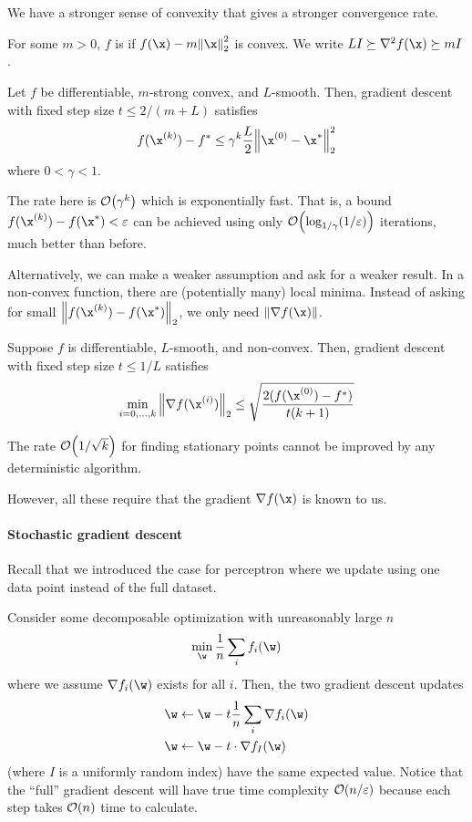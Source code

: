 \documentclass[class=cs480,notes,tikz]{agony}
\begin{document}
We have a stronger sense of convexity that gives a stronger convergence rate.

\begin{defn}
  For some $m > 0$, $f$ is 
  if $f(\x) - m\norm{\x}_2^2$ is convex.
  We write $LI \succeq \nabla^2f(\x) \succeq mI$.
\end{defn}

\begin{theorem}
  Let $f$ be differentiable, $m$-strong convex, and $L$-smooth.
  Then, gradient descent with fixed step size $t \leq 2/(m+L)$ satisfies
  \[ f(\x^{(k)}) - f^* \leq \gamma^k\frac{L}{2}\norm{\x^{(0)}-\x^*}_2^2 \]
  where $0 < \gamma < 1$.
\end{theorem}

The rate here is $\order{\gamma^k}$ which is exponentially fast.
That is, a bound $f(\x^{(k)}) - f(\x^*) < \varepsilon$
can be achieved using only $\order{\log_{1/\gamma}(1/\varepsilon)}$ iterations,
much better than before.

Alternatively, we can make a weaker assumption and ask for a weaker result.
In a non-convex function, there are (potentially many) local minima.
Instead of asking for small $\norm{f(\x^{(k)}) - f(\x^*)}_2$,
we only need $\norm{\nabla f(\x)}$.

\begin{theorem}
  Suppose $f$ is differentiable, $L$-smooth, and non-convex.
  Then, gradient descent with fixed step size $t \leq 1/L$ satisfies
  \[ \min_{i=0,\dotsc,k} \norm{\nabla f(\x^{(i)})}_2 \leq \sqrt{\frac{2(f(\x^{(0)}) - f^*)}{t(k+1)}} \]
\end{theorem}

The rate $\order{1/\sqrt{k}}$ for finding stationary points cannot be improved
by any deterministic algorithm.

However, all these require that the gradient $\nabla f(\x)$ is known to us.

\paragraph{Stochastic gradient descent}
Recall that we introduced the case for perceptron where we update using one data point
instead of the full dataset.

Consider some decomposable optimization with unreasonably large $n$
\[ \min_{\w} \frac1n\sum_i f_i(\w) \]
where we assume $\nabla f_i(\w)$ exists for all $i$.
Then, the two gradient descent updates
\begin{align*}
  \w & \gets \w - t\frac1n\sum_i \nabla f_i(\w) \\
  \w & \gets \w - t \cdot \nabla f_I(\w)
\end{align*}
(where $I$ is a uniformly random index) have the same expected value.
Notice that the ``full'' gradient descent will have true time complexity
$\order{n/\varepsilon}$ because each step takes $\order{n}$ time to calculate.
\end{document}
